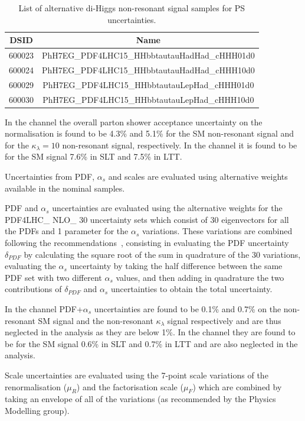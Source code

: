 \begin{table}
\centering
\begin{tabular}{|c|c|}
\hline
DSID & Name\\
\hline
600023 & PhH7EG\_PDF4LHC15\_HHbbtautauHadHad\_cHHH01d0\\
600024 & PhH7EG\_PDF4LHC15\_HHbbtautauHadHad\_cHHH10d0\\
600029 & PhH7EG\_PDF4LHC15\_HHbbtautauLepHad\_cHHH01d0\\
600030 & PhH7EG\_PDF4LHC15\_HHbbtautauLepHad\_cHHH10d0\\
\hline
\end{tabular}
\caption{List of alternative di-Higgs non-resonant signal samples for PS uncertainties.
}
\label{sec:systs:tab:systematics_NonRessignalsamples}
\end{table}


In the \hadhad channel the overall parton shower acceptance uncertainty on the normalisation is found to be 4.3\% and 5.1\% for the SM non-resonant signal and for the $\kappa_\lambda=10$ non-resonant signal, respectively.  In the \lephad channel it is found to be for the SM signal 7.6\% in SLT and 7.5\% in LTT.

Uncertainties from PDF, $\alpha_s$ and scales are evaluated using alternative weights available in the nominal samples.

PDF and $\alpha_s$ uncertainties are evaluated using the alternative weights for the PDF4LHC\_ NLO\_ 30 uncertainty sets which consist of 30 eigenvectors for all the PDFs and 1 parameter for the $\alpha_s$ variations. These variations are combined following the recommendations~\cite{Butterworth:2015oua}, consisting in evaluating the PDF uncertainty $\delta_{PDF}$ by calculating the square root of the sum in quadrature of the 30 variations, evaluating the $\alpha_s$ uncertainty by taking the half difference between the same PDF set with two different $\alpha_s$ values, and then adding in quadrature the two contributions of $\delta_{PDF}$ and $\alpha_s$ uncertainties to obtain the total uncertainty. 

In the \hadhad channel PDF+$\alpha_s$ uncertainties are found to be 0.1\% and 0.7\% on the non-resonant SM signal and the non-resonant $\kappa_\lambda$ signal respectively and are thus neglected in the analysis as they are below 1\%. In the \lephad channel they are found to be for the SM signal 0.6\% in SLT and 0.7\% in LTT and are also neglected in the analysis.

Scale uncertainties are evaluated using the 7-point scale variations of the renormalisation ($\mu_R$) and the factorisation scale ($\mu_F$) which are combined by taking an envelope of all of the variations (as recommended by the Physics Modelling group). 

